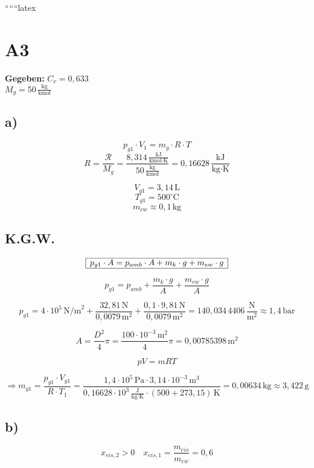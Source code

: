 
``````latex


\section*{A3}

\textbf{Gegeben:} $C_v = 0{,}633$ \\
$M_g = 50 \, \frac{\text{kg}}{\text{kmol}}$

\subsection*{a)}
\[
p_{g1} \cdot V_1 = m_g \cdot R \cdot T
\]
\[
R = \frac{\mathcal{R}}{M_g} = \frac{8{,}314 \, \frac{\text{kJ}}{\text{kmol} \cdot \text{K}}}{50 \, \frac{\text{kg}}{\text{kmol}}} = 0{,}16628 \, \frac{\text{kJ}}{\text{kg} \cdot \text{K}}
\]

\[
V_{g1} = 3{,}14 \, \text{L}
\]
\[
T_{g1} = 500^\circ \text{C}
\]
\[
m_{ew} \approx 0{,}1 \, \text{kg}
\]

\subsection*{K.G.W.}
\[
\begin{array}{|c|}
\hline
p_{g1} \cdot A = p_{amb} \cdot A + m_k \cdot g + m_{ew} \cdot g \\
\hline
\end{array}
\]

\[
p_{g1} = p_{amb} + \frac{m_k \cdot g}{A} + \frac{m_{ew} \cdot g}{A}
\]

\[
p_{g1} = 4 \cdot 10^5 \, \text{N/m}^2 + \frac{32{,}81 \, \text{N}}{0{,}0079 \, \text{m}^2} + \frac{0{,}1 \cdot 9{,}81 \, \text{N}}{0{,}0079 \, \text{m}^2} = 140{,}034 \, 4406 \, \frac{\text{N}}{\text{m}^2} \approx 1{,}4 \, \text{bar}
\]

\[
A = \frac{D^2}{4} \pi = \frac{100 \cdot 10^{-3} \, \text{m}^2}{4} \pi = 0{,}00785398 \, \text{m}^2
\]

\[
pV = mRT
\]

\[
\Rightarrow m_{g1} = \frac{p_{g1} \cdot V_{g1}}{R \cdot T_1} = \frac{1{,}4 \cdot 10^5 \, \text{Pa} \cdot 3{,}14 \cdot 10^{-3} \, \text{m}^3}{0{,}16628 \cdot 10^3 \, \frac{\text{J}}{\text{kg} \cdot \text{K}} \cdot (500 + 273{,}15) \, \text{K}} = 0{,}00634 \, \text{kg} \approx 3{,}422 \, \text{g}
\]

\subsection*{b)}
\[
x_{eis,2} > 0 \quad x_{eis,1} = \frac{m_{eis}}{m_{ew}} = 0{,}6
\]

